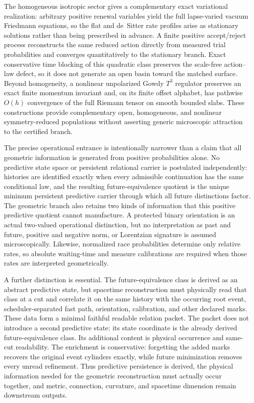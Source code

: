 \documentclass[11pt]{article}
\numberwithin{equation}{section}
\theoremstyle{definition}
\theoremstyle{remark}
\begin{document}
The homogeneous isotropic sector gives a complementary exact variational
realization: arbitrary positive renewal variables yield the full lapse-varied
vacuum Friedmann equations, so the flat and de~Sitter rate profiles arise as
stationary solutions rather than being prescribed in advance.  A finite
positive accept/reject process reconstructs the same reduced action directly
from measured trial probabilities and converges quantitatively to the
stationary branch.  Exact conservative time blocking of this quadratic class
preserves the scale-free action--law defect, so it does not generate an open
basin toward the matched surface.  Beyond homogeneity, a nonlinear unpolarized
Gowdy $T^3$ regulator preserves an exact finite momentum invariant and, on its
finite offset alphabet, has pathwise $O(h)$ convergence of the full Riemann
tensor on smooth bounded slabs.  These constructions provide complementary
open, homogeneous, and nonlinear symmetry-reduced populations without
asserting generic microscopic attraction to the certified branch.

The precise operational entrance is intentionally narrower than a claim that
all geometric information is generated from positive probabilities alone.
No predictive state space or persistent relational carrier is postulated
independently: histories are identified exactly when every admissible
continuation has the same conditional law, and the resulting
future-equivalence quotient is the unique minimum persistent predictive
carrier through which all future distinctions factor.  The geometric branch
also retains two kinds of information that this positive predictive quotient
cannot manufacture.  A protected binary orientation is an actual two-valued
operational distinction, but no interpretation as past and future,
positive and negative norm, or Lorentzian signature is assumed microscopically.
Likewise, normalized race probabilities determine only relative rates, so
absolute waiting-time and measure calibrations are required when those rates
are interpreted geometrically.

A further distinction is essential.  The future-equivalence class is derived
as an abstract predictive state, but spacetime reconstruction must physically
read that class at a cut and correlate it on the same history with the
occurring root event, scheduler-separated fast path, orientation, calibration,
and other declared marks.  These data form a minimal faithful readable relation
packet.  The packet does not introduce a second predictive state: its state
coordinate is the already derived future-equivalence class.  Its additional
content is physical occurrence and same-cut readability.  The enrichment is
conservative: forgetting the added marks recovers the original event cylinders
exactly, while future minimization removes every unread refinement.  Thus
predictive persistence is derived, the physical information needed for the
geometric reconstruction must actually occur together, and metric, connection,
curvature, and spacetime dimension remain downstream outputs.
\end{document}
